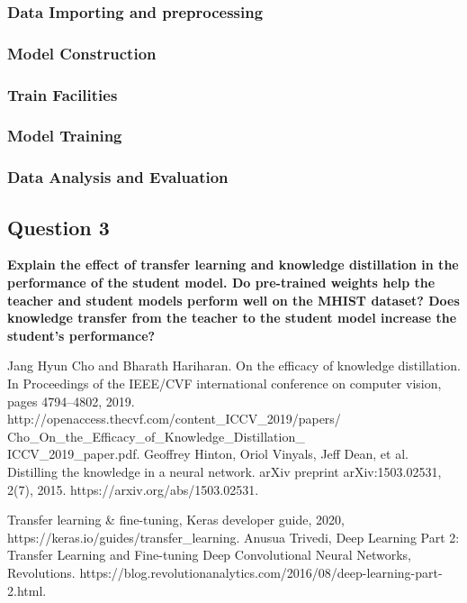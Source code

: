 \documentclass[conference]{IEEEtran}
\begin{document}
\subsubsection{Data Importing and preprocessing}

\subsubsection{Model Construction}

\subsubsection{Train Facilities}

\subsubsection{Model Training}

\subsubsection{Data Analysis and Evaluation}

\subsection{Question 3} \textbf{Explain the effect of transfer learning and knowledge distillation in the performance of the student model. Do pre-trained weights help the teacher and student models perform well on the MHIST dataset? Does knowledge transfer from the teacher to the student model increase the student’s performance?}


\begin{thebibliography}{00}


 Jang Hyun Cho and Bharath Hariharan. On the efficacy of knowledge distillation. In Proceedings of the IEEE/CVF international conference on computer vision, pages 4794–4802, 2019. http://openaccess.thecvf.com/content\_ICCV\_2019/papers/\\Cho\_On\_the\_Efficacy\_of\_Knowledge\_Distillation\_\\ICCV\_2019\_paper.pdf.
 Geoffrey Hinton, Oriol Vinyals, Jeff Dean, et al. Distilling the knowledge in a neural network. arXiv preprint arXiv:1503.02531, 2(7), 2015. https://arxiv.org/abs/1503.02531.


 Transfer learning \& fine-tuning, Keras developer guide, 2020, https://keras.io/guides/transfer\_learning.
 Anusua Trivedi, Deep Learning Part 2: Transfer Learning and Fine-tuning Deep Convolutional Neural Networks, Revolutions. https://blog.revolutionanalytics.com/2016/08/deep-learning-part-2.html.
\end{thebibliography}
\end{document}

